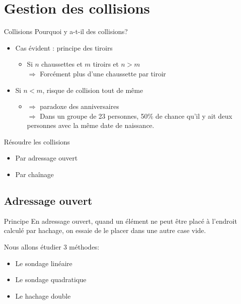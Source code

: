 \documentclass[12pt,a4paper]{beamer}
\begin{document}
\begin{frame}
\tableofcontents
\end{frame}

\section{Gestion des collisions}
\begin{frame}{Collisions}
Pourquoi y a-t-il des collisions?
\begin{itemize}
\item Cas évident : principe des tiroirs
\begin{itemize}
\item Si $n$ chaussettes et $m$ tiroirs et $n>m$\\
$\Rightarrow$ Forcément plus d'une chaussette par tiroir
\end{itemize}
\end{itemize}

\begin{itemize}
\item Si $n < m$, risque de collision tout de même
\begin{itemize}
\item $\Rightarrow$ paradoxe des anniversaires\\
$\Rightarrow$ Dans un groupe de 23 personnes, 50\% de chance qu'il y ait deux personnes avec la même date de naissance.
\end{itemize}
\end{itemize}
\end{frame}

\begin{frame}{Résoudre les collisions}

\begin{itemize}
\item Par adressage ouvert
\item Par chaînage
\end{itemize}

\end{frame}


\subsection{Adressage ouvert}

\begin{frame}
\begin{block}{Principe}
En adressage ouvert, quand un élément ne peut être placé à l'endroit calculé par hachage, on essaie de le placer dans une autre case vide.
\end{block}
\vspace{1em}
Nous allons étudier 3 méthodes:
\begin{itemize}
\item Le sondage linéaire
\item Le sondage quadratique
\item Le hachage double
\end{itemize}
\end{frame}
\end{document}
